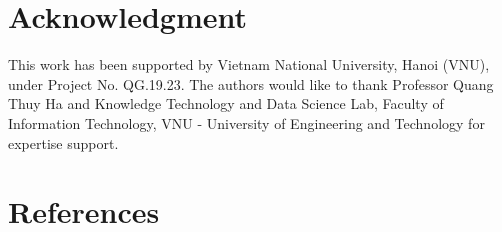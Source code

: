 \documentclass[]{iosart2c}
\begin{document}
  \section{Acknowledgment}

  This work has been supported by Vietnam National University, Hanoi (VNU), under Project No. QG.19.23. The authors would like to thank Professor Quang Thuy Ha and Knowledge Technology and Data Science Lab, Faculty of Information Technology, VNU - University of Engineering and Technology for expertise support.

  \section*{References}

  
\end{document}
